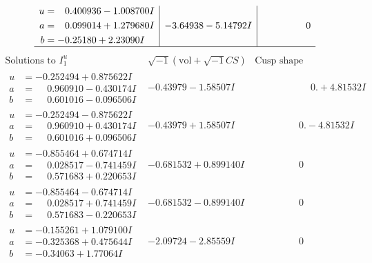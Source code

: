 \documentclass[1p]{elsarticle_modified}
\theoremstyle{definition}
\newcommand{\I}{\sqrt{-1}}
\begin{document}
$$\begin{array}{c|c|c}
\begin{aligned}
u &= \phantom{-}0.400936 - 1.008700 I \\
a &= \phantom{-}0.099014 + 1.279680 I \\
b &= -0.25180 + 2.23090 I\end{aligned}
 & -3.64938 - 5.14792 I & \phantom{-0.000000 } 0\\
 \hline 
 \end{array}$$\newpage$$\begin{array}{c|c|c}  
\text{Solutions to }I^u_{1}& \I (\text{vol} + \sqrt{-1}CS) & \text{Cusp shape}\\
 \hline 
\begin{aligned}
u &= -0.252494 + 0.875622 I \\
a &= \phantom{-}0.960910 - 0.430174 I \\
b &= \phantom{-}0.601016 - 0.096506 I\end{aligned}
 & -0.43979 - 1.58507 I & \phantom{-0.000000 -}0. + 4.81532 I \\ \hline\begin{aligned}
u &= -0.252494 - 0.875622 I \\
a &= \phantom{-}0.960910 + 0.430174 I \\
b &= \phantom{-}0.601016 + 0.096506 I\end{aligned}
 & -0.43979 + 1.58507 I & \phantom{-0.000000 } 0. - 4.81532 I \\ \hline\begin{aligned}
u &= -0.855464 + 0.674714 I \\
a &= \phantom{-}0.028517 - 0.741459 I \\
b &= \phantom{-}0.571683 + 0.220653 I\end{aligned}
 & -0.681532 + 0.899140 I & \phantom{-0.000000 } 0 \\ \hline\begin{aligned}
u &= -0.855464 - 0.674714 I \\
a &= \phantom{-}0.028517 + 0.741459 I \\
b &= \phantom{-}0.571683 - 0.220653 I\end{aligned}
 & -0.681532 - 0.899140 I & \phantom{-0.000000 } 0 \\ \hline\begin{aligned}
u &= -0.155261 + 1.079100 I \\
a &= -0.325368 + 0.475644 I \\
b &= -0.34063 + 1.77064 I\end{aligned}
 & -2.09724 - 2.85559 I & \phantom{-0.000000 } 0 \\ \hline\begin{aligned}

\end{aligned}
\end{array}$$
\end{document}
